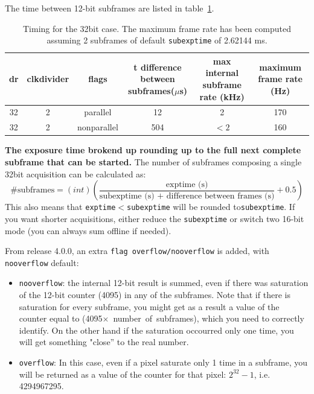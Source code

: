 \documentclass{article}
\begin{document}
The time between 12-bit subframes are listed in table~\ref{t32bitframe}.  
\begin{tiny}
\begin{table}
\begin{flushleft}
\begin{tabular}{|c|c|c|c|c|c|}
\hline
\tiny{dr} & \tiny{clkdivider} & \tiny{flags} & \tiny{t difference between subframes($\mu$s)} & \tiny{max internal subframe rate (kHz)} & \tiny{maximum frame rate (Hz)}\\
\hline
32 & 2 & parallel & 12 & 2 & 170\\
\hline
32 & 2 & nonparallel & 504 & $<2$ & 160\\
\hline
\end{tabular}
\caption{Timing for the 32bit case. The maximum frame rate has been computed assuming 2 subframes of default {\tt{subexptime}} of 2.62144 ms.}
\label{t32bitframe}
\end{flushleft}
\end{table}
\end{tiny}

\textbf{The exposure time brokend up rounding up to the full next complete subframe that can be started.}
The number of subframes composing a single 32bit acquisition can be calculated as:
\begin{equation}
\textrm{\# subframes}= (int) (\frac{\textrm{exptime (s)}}{\textrm{subexptime (s) + difference between frames (s)}}+0.5)
\end{equation}
This also means that {\tt{exptime}}$<${\tt{subexptime}} will be rounded to{\tt{subexptime}}. If you want shorter acquisitions, either reduce the {\tt{subexptime}} or switch two 16-bit mode (you can always sum offline if needed).   

From release 4.0.0, an extra {\tt{flag overflow/nooverflow}} is added, with {\tt{nooverflow}} default:
\begin{itemize}
\item {\tt{nooverflow}}: the internal 12-bit result is summed, even if there was saturation of the 12-bit counter (4095) in any of the subframes. Note that if there is saturation for every subframe, you might get as a result a value of the counter equal to (4095$\times$~number~of~subframes), which you need to correctly identify. On the other hand if the saturation occourred only one time, you will get something "close'' to the real number.
\item {\tt{overflow}}: In this case, even if a pixel saturate only 1 time in a subframe, you will be returned as a value of the counter for that pixel: $2^{32}-1$, i.e. 4294967295.  
\end{itemize}
\end{document}
